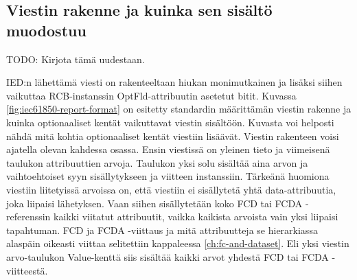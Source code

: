 \subsection{Viestin rakenne ja kuinka sen sisältö muodostuu}
\label{ch:viestin-rakenne}

TODO: Kirjota tämä uudestaan.

IED:n lähettämä viesti on rakenteeltaan hiukan monimutkainen ja lisäksi siihen vaikuttaa RCB-instanssin OptFld-attribuutin asetetut bitit. Kuvassa \ref{fig:iec61850-report-format} on esitetty standardin määrittämän viestin rakenne ja kuinka optionaaliset kentät vaikuttavat viestin sisältöön. Kuvasta voi helposti nähdä mitä kohtia optionaaliset kentät viestiin lisäävät. Viestin rakenteen voisi ajatella olevan kahdessa osassa. Ensin viestissä on yleinen tieto ja viimeisenä taulukon attribuuttien arvoja. Taulukon yksi solu sisältää aina arvon ja vaihtoehtoiset syyn sisällytykseen ja viitteen instanssiin. Tärkeänä huomiona viestiin liitetyissä arvoissa on, että viestiin ei sisällytetä yhtä data-attribuutia, joka liipaisi lähetyksen. Vaan siihen sisällytetään koko FCD tai FCDA -referenssin kaikki viitatut attribuutit, vaikka kaikista arvoista vain yksi liipaisi tapahtuman. FCD ja FCDA -viittaus ja mitä attribuutteja se hierarkiassa alaspäin oikeasti viittaa selitettiin kappaleessa \ref{ch:fc-and-dataset}. Eli yksi viestin arvo-taulukon Value-kenttä siis sisältää kaikki arvot yhdestä FCD tai FCDA -viitteestä.

